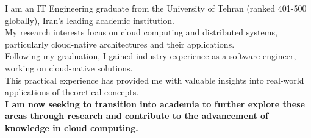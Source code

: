\vspace{0.2cm}


\begin{minipage}[t]{1\textwidth}
    \vspace{-\baselineskip}
    I am an IT Engineering graduate from the University of Tehran (ranked 401-500 globally), Iran's leading academic institution. \\
    My research interests focus on cloud computing and distributed systems, particularly cloud-native architectures and their applications. \\
    Following my graduation, I gained industry experience as a software engineer, working on cloud-native solutions. \\
    This practical experience has provided me with valuable insights into real-world applications of theoretical concepts. \\
    \textbf{I am now seeking to transition into academia to further explore these areas through research and contribute to the advancement of knowledge in cloud computing.}
\end{minipage}
